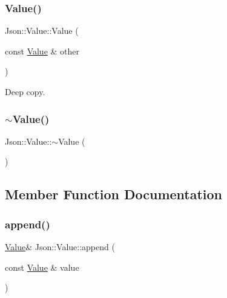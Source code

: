 \hypertarget{class_json_1_1_value_a436dfd3670f95fd665f680eba5cebcf0}{}\label{class_json_1_1_value_a436dfd3670f95fd665f680eba5cebcf0} 
\subsubsection{\texorpdfstring{Value()}{Value()}\hspace{0.1cm}{\footnotesize\ttfamily [24/24]}}
{\footnotesize\ttfamily Json\+::\+Value\+::\+Value (\begin{DoxyParamCaption}\item[{const \hyperlink{class_json_1_1_value}{Value} \&}]{other }\end{DoxyParamCaption})}



Deep copy. 

\hypertarget{class_json_1_1_value_a287dea48da3912d02756735bf677b27b}{}\label{class_json_1_1_value_a287dea48da3912d02756735bf677b27b} 
\subsubsection{\texorpdfstring{$\sim$\+Value()}{~Value()}\hspace{0.1cm}{\footnotesize\ttfamily [2/2]}}
{\footnotesize\ttfamily Json\+::\+Value\+::$\sim$\+Value (\begin{DoxyParamCaption}{ }\end{DoxyParamCaption})}



\subsection{Member Function Documentation}
\hypertarget{class_json_1_1_value_a3b7c0ef3bb1958cafdf10483e93ed711}{}\label{class_json_1_1_value_a3b7c0ef3bb1958cafdf10483e93ed711} 
\subsubsection{\texorpdfstring{append()}{append()}\hspace{0.1cm}{\footnotesize\ttfamily [1/2]}}
{\footnotesize\ttfamily \hyperlink{class_json_1_1_value}{Value}\& Json\+::\+Value\+::append (\begin{DoxyParamCaption}\item[{const \hyperlink{class_json_1_1_value}{Value} \&}]{value }\end{DoxyParamCaption})}



